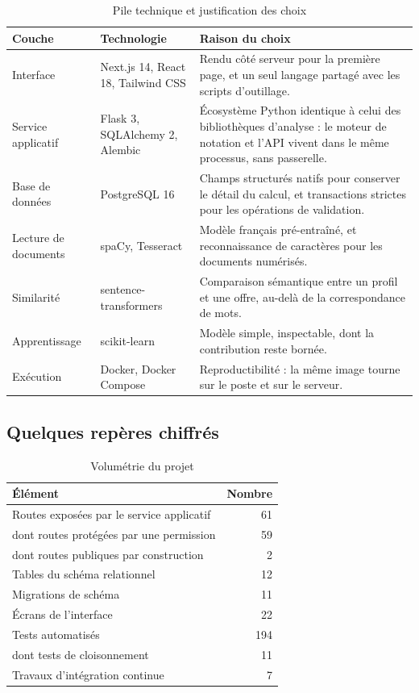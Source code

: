 \documentclass[12pt,a4paper]{report}
\begin{document}
\begin{table}[H]
\centering
\caption{Pile technique et justification des choix}
\label{tab:pile}
\begin{tabular}{@{}p{3.3cm}p{4.0cm}p{6.4cm}@{}}
\toprule
\textbf{Couche} & \textbf{Technologie} & \textbf{Raison du choix} \\
\midrule
Interface & Next.js 14, React 18, Tailwind CSS &
  Rendu côté serveur pour la première page, et un seul langage partagé avec
  les scripts d'outillage. \\
Service applicatif & Flask 3, SQLAlchemy 2, Alembic &
  Écosystème Python identique à celui des bibliothèques d'analyse : le moteur
  de notation et l'API vivent dans le même processus, sans passerelle. \\
Base de données & PostgreSQL 16 &
  Champs structurés natifs pour conserver le détail du calcul, et
  transactions strictes pour les opérations de validation. \\
Lecture de documents & spaCy, Tesseract &
  Modèle français pré-entraîné, et reconnaissance de caractères pour les
  documents numérisés. \\
Similarité & sentence-transformers &
  Comparaison sémantique entre un profil et une offre, au-delà de la
  correspondance de mots. \\
Apprentissage & scikit-learn &
  Modèle simple, inspectable, dont la contribution reste bornée. \\
Exécution & Docker, Docker Compose &
  Reproductibilité : la même image tourne sur le poste et sur le serveur. \\
\bottomrule
\end{tabular}
\end{table}

\subsection{Quelques repères chiffrés}

\begin{table}[H]
\centering
\caption{Volumétrie du projet}
\label{tab:volumetrie}
\begin{tabular}{@{}lr@{}}
\toprule
\textbf{Élément} & \textbf{Nombre} \\
\midrule
Routes exposées par le service applicatif & 61 \\
\quad dont routes protégées par une permission & 59 \\
\quad dont routes publiques par construction & 2 \\
Tables du schéma relationnel & 12 \\
Migrations de schéma & 11 \\
Écrans de l'interface & 22 \\
Tests automatisés & 194 \\
\quad dont tests de cloisonnement & 11 \\
Travaux d'intégration continue & 7 \\
\bottomrule
\end{tabular}
\end{table}
\end{document}
